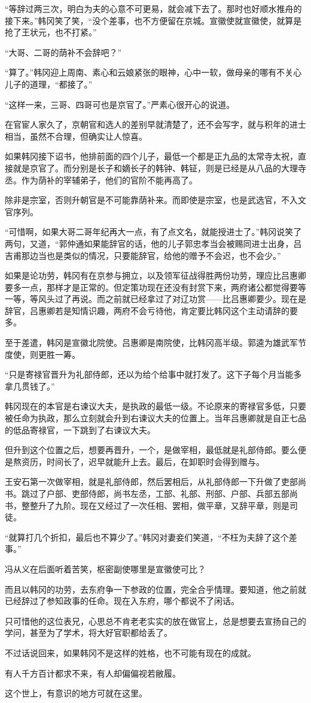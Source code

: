 “等辞过两三次，明白为夫的心意不可更易，就会减下去了。那时也好顺水推舟的接下来。”韩冈笑了笑，“没个差事，也不方便留在京城。宣徽使就宣徽使，就算是抢了王状元，也不打紧。”

“大哥、二哥的荫补不会辞吧？”

“算了。”韩冈迎上周南、素心和云娘紧张的眼神，心中一软，做母亲的哪有不关心儿子的道理，“都接了。”

“这样一来，三哥、四哥可也是京官了。”严素心很开心的说道。

在官宦人家久了，京朝官和选人的差别早就清楚了，还不会写字，就与积年的进士相当，虽然不合理，但确实让人惊喜。

如果韩冈接下诏书，他排前面的四个儿子，最低一个都是正九品的太常寺太祝，直接就是京官了。而分别是长子和嫡长子的韩钟、韩钲，则是已经是从八品的大理寺丞。作为荫补的宰辅弟子，他们的官阶不能再高了。

除非是宗室，否则升朝官是不可能靠荫补来。而即使是宗室，也是武选官，不入文官序列。

“可惜啊，如果大哥二哥年纪再大一点，有了点文名，就能授进士了。”韩冈说笑了两句，又道，“郭仲通如果能辞官的话，他的儿子郭忠孝当会被赐同进士出身，吕吉甫那边当也是类似的情况，只要能辞官，给他的赠予不会迟，也不会少。”

如果是论功劳，韩冈有在京参与拥立，以及领军征战得胜两份功劳，理应比吕惠卿要多一点，那样才是正常的。但定策功现在还没有封赏下来，两府诸公都觉得要等一等，等风头过了再说。而之前就已经拿过了对辽功赏——比吕惠卿要少。现在是辞官，吕惠卿若是知情识趣，两府不会亏待他，肯定要比韩冈这个主动请辞的要多。

至于差遣，韩冈是宣徽北院使。吕惠卿是南院使，比韩冈高半级。郭逵为雄武军节度使，则更胜一筹。

“只是寄禄官晋升为礼部侍郎，还以为给个给事中就打发了。这下子每个月当能多拿几贯钱了。”

韩冈现在的本官是右谏议大夫，是执政的最低一级。不论原来的寄禄官多低，只要被任命为执政，那么立刻就会升到右谏议大夫的位置上。当年吕惠卿就是自正七品的低品寄禄官，一下跳到了右谏议大夫。

但升到这个位置之后，想要再晋升，一个，是做宰相，最低就是礼部侍郎。要么便是熬资历，时间长了，迟早就能升上去。最后，在卸职时会得到赠与。

王安石第一次做宰相，就是礼部侍郎，然后罢相后，从礼部侍郎一下升做了吏部尚书。跳过了户部、吏部侍郎，尚书左丞，工部、礼部、刑部、户部、兵部五部尚书，整整升了九阶。现在又经过了一次任相、罢相，做平章，又辞平章，则是司徒。

“就算打几个折扣，最后也不算少了。”韩冈对妻妾们笑道，“不枉为夫辞了这个差事。”

冯从义在后面听着苦笑，枢密副使哪里是宣徽使可比？

而且以韩冈的功劳，去东府争一下参政的位置，完全合乎情理。要知道，他之前就已经辞过了参知政事的任命。现在入东府，哪个都说不了闲话。

只可惜他的这位表兄，心思总不肯老老实实的放在做官上，总是想要去宣扬自己的学问，甚至为了学术，将大好官职都给丢了。

不过话说回来，如果韩冈不是这样的姓格，也不可能有现在的成就。

有人千方百计都求不来，有人却偏偏视若敝履。

这个世上，有意识的地方可就在这里。

